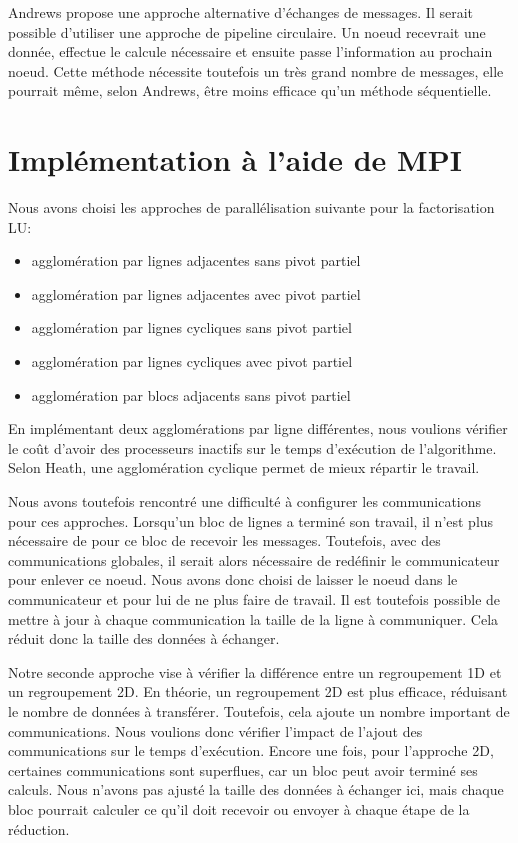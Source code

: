 \documentclass[12pt,letterpaper]{article} %
\begin{document}
Andrews propose une approche alternative d'échanges de messages\cite{andrews1999FouMulParDisPro}.
Il serait possible d'utiliser une approche de pipeline circulaire. Un noeud recevrait une
donnée, effectue le calcule nécessaire et ensuite passe l'information au prochain noeud.
Cette méthode nécessite toutefois un très grand nombre de messages, elle pourrait même, selon
Andrews, être moins efficace qu'un méthode séquentielle.

\section{Implémentation à l'aide de MPI}

Nous avons choisi les approches de parallélisation suivante pour la factorisation LU:

\begin{itemize}
 \item agglomération par lignes adjacentes sans pivot partiel
 \item agglomération par lignes adjacentes avec pivot partiel
 \item agglomération par lignes cycliques sans pivot partiel
 \item agglomération par lignes cycliques avec pivot partiel
 \item agglomération par blocs adjacents sans pivot partiel
\end{itemize}

En implémentant deux agglomérations par ligne différentes, nous voulions vérifier le coût
d'avoir des processeurs inactifs sur le temps d'exécution de l'algorithme. Selon Heath, une
agglomération cyclique permet de mieux répartir le travail. 

Nous avons toutefois rencontré
une difficulté à configurer les communications pour ces approches. Lorsqu'un bloc de lignes
a terminé son travail, il n'est plus nécessaire de pour ce bloc de recevoir les messages.
Toutefois, avec des communications globales, il serait alors nécessaire de redéfinir le
communicateur pour enlever ce noeud. Nous avons donc choisi de laisser le noeud dans le
communicateur et pour lui de ne plus faire de travail. Il est toutefois possible de
mettre à jour à chaque communication la taille de la ligne à communiquer. Cela réduit
donc la taille des données à échanger.

Notre seconde approche vise à vérifier la différence entre un regroupement 1D et un regroupement
2D. En théorie, un regroupement 2D est plus efficace, réduisant le nombre de données à 
transférer. Toutefois, cela ajoute un nombre important de communications. Nous voulions donc
vérifier l'impact de l'ajout des communications sur le temps d'exécution. Encore une fois, 
pour l'approche 2D, certaines communications sont superflues, car un bloc peut avoir terminé
ses calculs. Nous n'avons pas ajusté la taille des données à échanger ici, mais chaque bloc 
pourrait calculer ce qu'il doit recevoir ou envoyer à chaque étape de la réduction.
\end{document}
